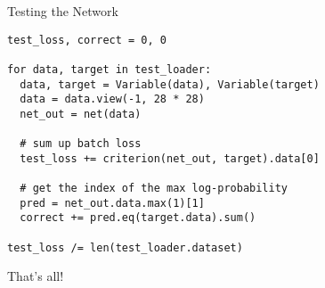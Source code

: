 \documentclass[14 pt]{beamer}
\begin{document}
\begin{frame}[fragile]{Testing the Network}
\footnotesize{
  \begin{block}{}
\begin{verbatim}
test_loss, correct = 0, 0

for data, target in test_loader:
  data, target = Variable(data), Variable(target)
  data = data.view(-1, 28 * 28)
  net_out = net(data)

  # sum up batch loss
  test_loss += criterion(net_out, target).data[0]

  # get the index of the max log-probability
  pred = net_out.data.max(1)[1]
  correct += pred.eq(target.data).sum()

test_loss /= len(test_loader.dataset)
\end{verbatim}
  \end{block}
}
\end{frame}
\begin{frame}
  \Large{
    \begin{center}
      That's all!
    \end{center}
  }
\end{frame}
\end{document}
